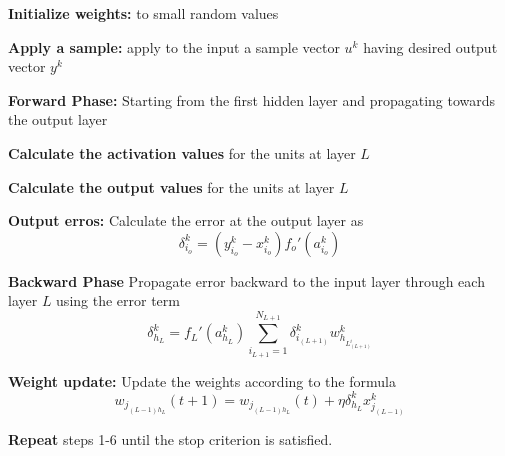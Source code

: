 \documentclass[12pt, a4paper, twoside]{book}
\begin{document}
\begin{steps}
    \item  \textbf{Initialize weights:} to small random values
    \item  \textbf{Apply a sample:} apply to the input a sample vector $u^k$ having desired output vector $y^k$
    \item  \textbf{Forward Phase:} Starting from the first hidden layer and propagating towards the output layer
    \begin{steps}
        \item \textbf{Calculate the activation values} for the units at layer $L$
        \item \textbf{Calculate the output values} for the units at layer $L$
    \end{steps} 
    \item \textbf{Output erros:} Calculate the error at the output layer as
    \[\delta_{i_o}^k = (y_{i_o}^k - x_{i_o}^k)f_o'(a_{i_o}^k)\]
    \item \textbf{Backward Phase} Propagate error backward to the input layer through each layer $L$ using the error term
    \[\delta_{h_L}^k = f_L'(a_{h_L}^k)\sum_{i_{L+1}=1}^{N_{L+1}}\delta_{i_{(L+1)}}^k w_{h_{L_{(L+1)}^i}}^k\]
    \item \textbf{Weight update:} Update the weights according to the formula
    \[w_{j_{(L-1)h_L}}(t+1) = w_{j_{(L-1)h_L}}(t) +\eta\delta_{h_L}^kx_{j_{(L-1)}}^k \] 
    \item \textbf{Repeat} steps 1-6 until the stop criterion is satisfied.
\end{steps}
\end{document}
